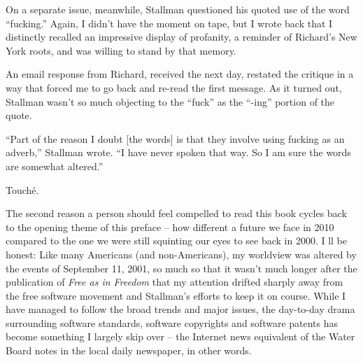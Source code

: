 \ifdefined\chs

\fi

\ifdefined\eng
On a separate issue, meanwhile, Stallman questioned his quoted use of
the word ``fucking.'' Again, I didn't have the moment on tape, but I
wrote back that I distinctly recalled an impressive display of
profanity, a reminder of Richard's New York roots, and was willing to
stand by that memory.
\fi

\ifdefined\chs

\fi

\ifdefined\eng
An email response from Richard, received the next day, restated the
critique in a way that forced me to go back and re-read the first
message. As it turned out, Stallman wasn't so much objecting to the
``fuck'' as the ``-ing'' portion of the quote.
\fi

\ifdefined\chs

\fi

\ifdefined\eng
``Part of the reason I doubt [the words] is that they involve using
fucking as an adverb,'' Stallman wrote. ``I have never spoken that
way. So I am sure the words are somewhat altered.''
\fi

\ifdefined\chs

\fi

\ifdefined\eng
Touché.
\fi

\ifdefined\chs

\fi

\ifdefined\eng
The second reason a person should feel compelled to read this book
cycles back to the opening theme of this preface -- how different a
future we face in 2010 compared to the one we were still squinting our
eyes to see back in 2000. I ll be honest: Like many Americans (and
non-Americans), my worldview was altered by the events of September
11, 2001, so much so that it wasn't much longer after the publication
of \textit{Free as in Freedom} that my attention drifted sharply away
from the free software movement and Stallman's efforts to keep it on
course. While I have managed to follow the broad trends and major
issues, the day-to-day drama surrounding software standards, software
copyrights and software patents has become something I largely skip
over -- the Internet news equivalent of the Water Board notes in the
local daily newspaper, in other words.
\fi

\ifdefined\chs

\fi

\ifdefined{}
\fi

